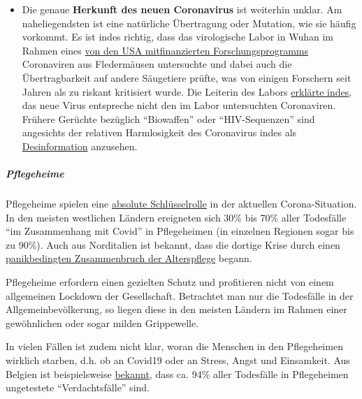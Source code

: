 \begin{itemize}
{  deshalb damit}, dass auch die Covid19-Coronaviren mittelfristig als
  gewöhnliche Corona-Erkältungsviren zu sehen sind.
\item
  Die genaue \textbf{Herkunft des neuen Coronavirus} ist weiterhin
  unklar. Am naheliegendsten ist eine natürliche Übertragung oder
  Mutation, wie sie häufig vorkommt. Es ist indes richtig, dass das
  virologische Labor in Wuhan im Rahmen eines
  \href{https://www.newsweek.com/dr-fauci-backed-controversial-wuhan-lab-millions-us-dollars-risky-coronavirus-research-1500741}{von
  den USA mitfinanzierten Forschungs­programms} Coronaviren aus
  Fledermäusen untersuchte und dabei auch die Übertragbarkeit auf andere
  Säugetiere prüfte, was von einigen Forschern seit Jahren als zu
  riskant kritisiert wurde. Die Leiterin des Labors
  \href{https://www.scientificamerican.com/article/how-chinas-bat-woman-hunted-down-viruses-from-sars-to-the-new-coronavirus1/}{erklärte
  indes}, das neue Virus entspreche nicht den im Labor untersuchten
  Coronaviren. Frühere Gerüchte bezüglich ``Biowaffen'' oder
  ``HIV-Sequenzen'' sind angesichts der relativen Harmlosigkeit des
  Coronavirus indes als
  \href{https://onlinelibrary.wiley.com/doi/full/10.1111/eci.13222}{Desinformation}
  anzusehen.
\end{itemize}

\hypertarget{pflegeheime}{%
\subparagraph{\texorpdfstring{\textbf{Pflegeheime}}{Pflegeheime}}\label{pflegeheime}}

Pflegeheime spielen eine
\href{https://ltccovid.org/2020/04/12/mortality-associated-with-covid-19-outbreaks-in-care-homes-early-international-evidence/}{absolute
Schlüsselrolle} in der aktuellen Corona-Situation. In den meisten
westlichen Ländern ereigneten sich 30\% bis 70\% aller Todesfälle ``im
Zusammenhang mit Covid'' in Pflegeheimen (in einzelnen Regionen sogar
bis zu 90\%). Auch aus Norditalien ist bekannt, dass die dortige Krise
durch einen
\href{https://swprs.org/covid19-bericht-aus-italien/}{panikbedingten
Zusammenbruch der Alterspflege} begann.

Pflegeheime erfordern einen gezielten Schutz und profitieren nicht von
einem allgemeinen Lockdown der Gesellschaft. Betrachtet man nur die
Todesfälle in der Allgemeinbevölkerung, so liegen diese in den meisten
Ländern im Rahmen einer gewöhnlichen oder sogar milden Grippewelle.

In vielen Fällen ist zudem nicht klar, woran die Menschen in den
Pflegeheimen wirklich starben, d.h. ob an Covid19 oder an Stress, Angst
und Einsamkeit. Aus Belgien ist beispielsweise
\href{https://web.archive.org/web/20200424212535/https://covid-19.sciensano.be/sites/default/files/Covid19/Meest\%20recente\%20update.pdf}{bekannt},
dass ca. 94\% aller Todesfälle in Pflegeheimen ungetestete
``Verdachtsfälle'' sind.

